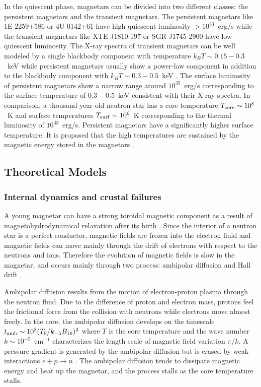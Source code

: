 In the quiescent phase, magnetars can be divided into two different classes: the persistent magnetars and the transient magnetars.
The persistent magnetars like 1E 2259+586 or 4U 0142+61 have high quiescent luminosity $>10^{33}$~erg/s while the transient magnetars like XTE J1810-197 or SGR J1745-2900  have low quiescent luminosity.
The X-ray spectra of transient magnetars can be well modeled by a single blackbody component with temperature $k_B T\sim 0.15-0.3$~keV while persistent magnetars usually show a power-law component in addition to the blackbody component with $k_B T\sim 0.3-0.5$~keV \citep{2014ApJS..212....6O}.
The surface luminosity of persistent magnetars show a narrow range around $10^{35}$~erg/s \citep{2006ApJ...650.1070D} corresponding to the surface temperature of $0.3-0.5$~keV consistent with their X-ray spectra.
In comparison,  a thousand-year-old neutron star has a core temperature $T_{\rm core}\sim 10^8$~K and surface temperatures $T_{\rm surf}\sim 10^6$~K \citep{2004ARA&A..42..169Y}  corresponding to the thermal luminosity of $10^{33}$~erg/s.
Persistent magnetars have a significantly higher surface temperature.
It is proposed that the high temperatures are sustained by the magnetic energy stored in the magnetars \citep{1992ApJ...392L...9D,1992AcA....42..145P} .

\subsection{Theoretical Models}
\subsubsection{Internal dynamics and crustal failures}
A young magnetar can have a strong toroidal magnetic component as a result of magnetohydrodynamical relaxation after its birth \citep{2009MNRAS.397..763B}.
Since the interior of a neutron star is a perfect conductor, magnetic fields are frozen into the electron fluid and magnetic fields can move mainly through the drift of electrons with respect to the neutrons and ions.
Therefore the evolution of magnetic fields is slow in the magnetar, and occurs mainly through two process: ambipolar diffusion and Hall drift \citep{1992ApJ...395..250G}.

Ambipolar diffusion results from the motion of electron-proton plasma through the neutron fluid. 
Due to the difference of proton and electron mass, protons feel the frictional force from the collision with neutrons while electrons move almost freely.
In the core, the ambipolar diffusion  develops on the timescale $t_{\rm amb}\sim 10^3 (T_9/k_{-5}B_{16})^2$ \citep{2016ApJ...833..261B} where $T$ is the core temperature and the wave number $k\sim 10^{-5}$~cm$^{-1}$ characterizes the length scale of magnetic field variation $\pi/k$.
A pressure gradient is generated by the ambipolar diffusion but is erased by weak interactions $e+p\rightarrow n$ \citep{1992ApJ...395..250G,2016ApJ...833..261B}.
The ambipolar diffusion tends to dissipate magnetic energy and heat up the magnetar, and the process stalls as the core temperature stalls.

